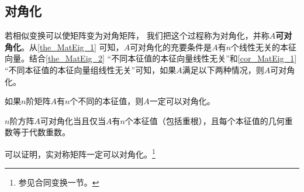 \subsection{对角化}

若相似变换可以使矩阵变为对角矩阵， 我们把这个过程称为对角化，并称$A$\textbf{可对角化}。从\autoref{the_MatEig_1} 可知，$A$可对角化的充要条件是$A$有$n$个线性无关的本征向量。结合\autoref{the_MatEig_2} “不同本征值的本征向量线性无关”和\autoref{cor_MatEig_1} “不同本征值的本征向量组线性无关”可知，如果$A$满足以下两种情况，则$A$可对角化。
\begin{corollary}{}
如果$n$阶矩阵$A$有$n$个不同的本征值，则$A$一定可以对角化。
\end{corollary}
\begin{corollary}{}
$n$阶方阵$A$可对角化当且仅当$A$有$n$个本征值（包括重根），且每个本征值的几何重数等于代数重数。
\end{corollary}



可以证明，实对称矩阵一定可以对角化。\footnote{参见合同变换一节。}

